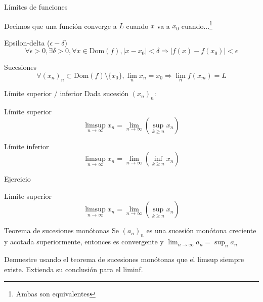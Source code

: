 \documentclass[14pt,aspectratio=169,xcolor=dvipsnames]{beamer}
\begin{document}
\begin{frame}{Límites de funciones}
    \begin{small}
        Decimos que una función converge a $L$ cuando $x$ va a $x_0$ cuando...\footnote{Ambas son equivalentes}
        \begin{block}{Epsilon-delta ($\epsilon-\delta$)}
            $$\forall \epsilon>0, \exists \delta >0, \forall x\in \text{Dom}(f), |x-x_0|<\delta \Rightarrow |f(x) - f(x_0)| < \epsilon $$
        \end{block}

        \begin{block}{Sucesiones}
            $$\forall (x_n)_n \subset \text{Dom}(f)\setminus \{x_0\}, \lim_n x_n = x_0 \Rightarrow \lim_n f(x_m) = L $$
        \end{block}
    \end{small}
\end{frame}
\begin{frame}{Límite superior / inferior}
    Dada sucesión $(x_n)_n$:
    \begin{block}{Límite superior}
        $$\limsup_{n\to\infty}x_n = \lim_{n\to\infty}\left(\sup_{k\geq n}x_n\right) $$
    \end{block}

    \begin{block}{Límite inferior}
        $$\limsup_{n\to\infty}x_n = \lim_{n\to\infty}\left(\inf_{k\geq n}x_n\right)$$
    \end{block}
\end{frame}
\begin{frame}[t]{Ejercicio}
    \begin{block}{Límite superior}
        $$\limsup_{n\to\infty}x_n = \lim_{n\to\infty}\left(\sup_{k\geq n}x_n\right) $$
    \end{block}
    \begin{block}{Teorema de sucesiones monótonas}
        Se $(a_n)_n$ es una sucesión monótona creciente y acotada superiormente, entonces es convergente y $ \lim_{n \to \infty}a_n = \sup_n a_n $
    \end{block}
    Demuestre usando el teorema de sucesiones monótonas que el limsup siempre existe. Extienda su conclusión para el liminf. 
\end{frame}
\end{document}
